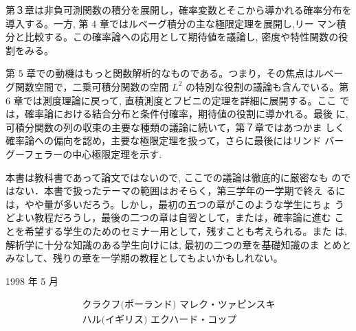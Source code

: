 \documentclass[14pt]{jsarticle}
\begin{document}
第３章は非負可測関数の積分を展開し，確率変数とそこから導かれる確率分布を導入する。一方, 第 4 章ではルベーグ積分の主な極限定理を展開し,リー マン積分と比較する。この確率論への応用として期待値を議論し, 密度や特性関数の役割をみる。

第 5 章での動機はもっと関数解析的なものである。つまり，その焦点はルベー グ関数空間で，二乗可積分関数の空間 $L^{2}$ の特別な役割の議論も含んでいる。第 6 章では測度理論に戻って, 直積測度とフビニの定理を詳細に展開する。ここ では，確率論における結合分布と条件付確率，期待値の役割に導かれる。最後 に, 可積分関数の列の収束の主要な種類の議論に続いて，第７章ではあつかま しく確率論への偏向を認め，主要な極限定理を扱って，さらに最後にはリンド バーグーフェラーの中心極限定理を示す.

本書は教科書であって論文ではないので, ここでの議論は徹底的に厳密なも のではない．本書で扱ったテーマの範囲はおそらく，第三学年の一学期で終え るには，やや量が多いだろう。しかし，最初の五つの章がこのような学生にちょ うどよい教程だろうし，最後の二つの章は自習として，または，確率論に進む ことを希望する学生のためのセミナー用として，残すことも考えられる。また は, 解析学に十分な知識のある学生向けには, 最初の二つの章を基礎知識のま とめとみなして、残りの章を一学期の教程としてもよいかもしれない。

1998 年 5 月

$$
\begin{array}{r}
\text { クラクフ(ポーランド) マレク・ツァピンスキ } \\
\text { ハル(イギリス) エクハード・コップ }
\end{array}
$$
\end{document}
